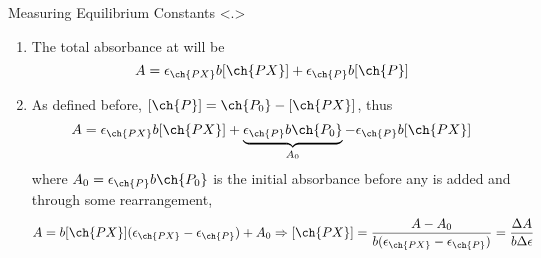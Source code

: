 \documentclass[notes=only]{beamer}
\begin{document}
\begin{frame}[t]{Measuring Equilibrium Constants}
\note<.>{%
	\begin{enumerate}
		\item The total absorbance at \textlambda{} will be
			\begin{equation*}
				A = \epsilon_{\ch{PX}}b[\ch{PX}] +
				\epsilon_{\ch{P}}b[\ch{P}]
			\end{equation*}
		\item As defined before, $[\ch{P}] = \ch{P_0} - [\ch{PX}]$, thus
			\begin{equation*}
				A = \epsilon_{\ch{PX}}b[\ch{PX}] +
				\underbrace{\epsilon_{\ch{P}}b\ch{P_0}}_{A_0} -
				\epsilon_{\ch{P}}b[\ch{PX}]
			\end{equation*}
			where $A_0 = \epsilon_{\ch{P}}b\ch{P_0}$ is the initial
			absorbance before any  is added and through some
			rearrangement,
			\begin{equation*}
				A = b[\ch{PX}](\epsilon_{\ch{PX}} -
				\epsilon_{\ch{P}}) + A_0 \Rightarrow
				[\ch{PX}] = \frac{A - A_0}{b(\epsilon_{\ch{PX}}
				- \epsilon_{\ch{P}})} = \frac{\Delta A}{b \Delta
				\epsilon}
			\end{equation*}
	\end{enumerate}
}
\end{frame}

\end{document}
